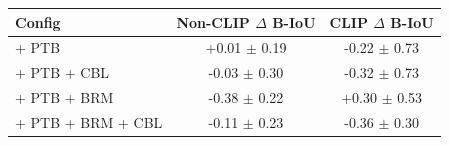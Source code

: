 \begin{tabular}{lcc}
\toprule
Config & Non-CLIP $\Delta$ B-IoU & CLIP $\Delta$ B-IoU \\
\midrule
+ PTB & +0.01 $\pm$ 0.19 & -0.22 $\pm$ 0.73 \\
+ PTB + CBL & -0.03 $\pm$ 0.30 & -0.32 $\pm$ 0.73 \\
+ PTB + BRM & -0.38 $\pm$ 0.22 & +0.30 $\pm$ 0.53 \\
+ PTB + BRM + CBL & -0.11 $\pm$ 0.23 & -0.36 $\pm$ 0.30 \\
\bottomrule
\end{tabular}
